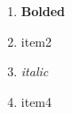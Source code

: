 \documentclass{article}
\begin{document}
    \begin{enumerate}
        \item \textbf{Bolded}
        \item item2
        \item \textit{italic}
        \item item4
    \end{enumerate}
\end{document}
